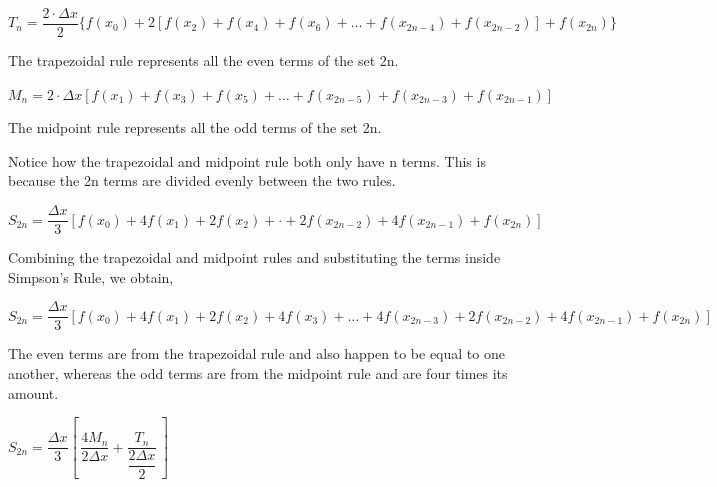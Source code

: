\documentclass[letterpaper,12pt]{article}
\theoremstyle{definition}
\begin{document}
\vspace{1cm}

\begin{center}
\end{center}

\vspace{1cm}

$T_n=\dfrac{2\cdot\Delta x}{2}\{f(x_0)+2[f(x_2)+f(x_4)+f(x_6)+\ldots +f(x_{2n-4})+f(x_{2n-2})]+f(x_{2n})\}$

\vspace{0.5cm}

The trapezoidal rule represents all the even terms of the set 2n.

\vspace{1cm}

$M_n=2\cdot \Delta x[f(x_1)+f(x_3)+f(x_5)+\ldots +f(x_{2n-5})+f(x_{2n-3})+f(x_{2n-1})]$

\vspace{0.5cm}

The midpoint rule represents all the odd terms of the set 2n.

\vspace{0.5cm}

Notice how the trapezoidal and midpoint rule both only have n terms. This is because the 2n terms are divided evenly between the two rules.

\vspace{1cm}

$S_{2n}=\dfrac{\Delta x}{3}[f(x_0)+4f(x_1)+2f(x_2)+\cdot +2f(x_{2n-2})+4f(x_{2n-1})+f(x_{2n})]$

\vspace{0.5cm}

Combining the trapezoidal and midpoint rules and substituting the terms inside Simpson's Rule, we obtain,

\vspace{1cm}

$S_{2n}=\dfrac{\Delta x}{3}[f(x_0)+4f(x_1)+2f(x_2)+4f(x_3)+\ldots +4f(x_{2n-3})+2f(x_{2n-2})+4f(x_{2n-1})+f(x_{2n})]$

\vspace{0.5cm}

The even terms are from the trapezoidal rule and also happen to be equal to one another, whereas the odd terms are from the midpoint rule and are four times its amount.

\vspace{1cm}

\pagebreak

$S_{2n}=\dfrac{\Delta x}{3}[\, \dfrac{4M_n}{2\Delta x}+\dfrac{T_n}{\dfrac{2\Delta x}{2}}\, ]$
\end{document}
